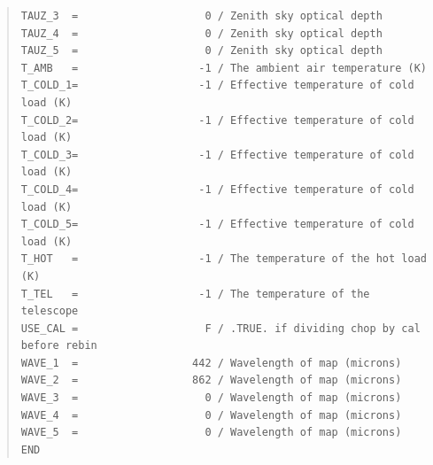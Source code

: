 \documentclass[twoside,11pt]{article}
\newenvironment{myquote}{\begin{quote}\begin{small}}{\end{small}\end{quote}}
\renewcommand{\_}{\texttt{\symbol{95}}}
\begin{document}
\begin{myquote}
\begin{verbatim}
TAUZ_3  =                    0 / Zenith sky optical depth
TAUZ_4  =                    0 / Zenith sky optical depth
TAUZ_5  =                    0 / Zenith sky optical depth
T_AMB   =                   -1 / The ambient air temperature (K)
T_COLD_1=                   -1 / Effective temperature of cold load (K)
T_COLD_2=                   -1 / Effective temperature of cold load (K)
T_COLD_3=                   -1 / Effective temperature of cold load (K)
T_COLD_4=                   -1 / Effective temperature of cold load (K)
T_COLD_5=                   -1 / Effective temperature of cold load (K)
T_HOT   =                   -1 / The temperature of the hot load (K)
T_TEL   =                   -1 / The temperature of the telescope
USE_CAL =                    F / .TRUE. if dividing chop by cal before rebin
WAVE_1  =                  442 / Wavelength of map (microns)
WAVE_2  =                  862 / Wavelength of map (microns)
WAVE_3  =                    0 / Wavelength of map (microns)
WAVE_4  =                    0 / Wavelength of map (microns)
WAVE_5  =                    0 / Wavelength of map (microns)
END
\end{verbatim}
\end{myquote}
\end{document}
